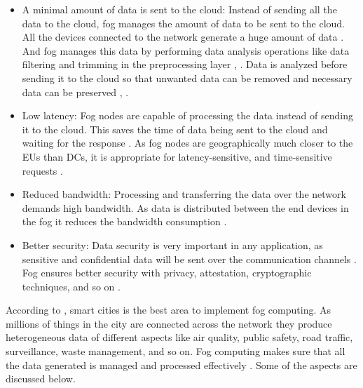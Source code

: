 \begin{itemize}
    \item A minimal amount of data is sent to the cloud:  Instead of sending all the data to the cloud, fog manages the amount of data to be sent to the cloud. All the devices connected to the network generate a huge amount of data \cite{sandra}. And fog manages this data by performing data analysis operations \cite{webpage} like data filtering and trimming in the preprocessing layer \cite{mukherjee2018survey}, \cite{sandra}. Data is analyzed before sending it to the cloud so that unwanted data can be removed  and necessary data can be preserved \cite{webpage}, \cite{sandra}.
    \item Low latency: Fog nodes are capable of processing the data instead of sending it to the cloud. This saves the time of data being sent to the cloud and waiting for the response \cite{sandra}. As fog nodes are geographically much closer to the EUs than DCs, it is appropriate for latency-sensitive, and time-sensitive requests \cite{mukherjee2018survey}.
    \item Reduced bandwidth: Processing and transferring the data over the network demands high bandwidth. As data is distributed between the end devices in the fog it reduces the bandwidth consumption \cite{sandra}. 
    \item Better security: Data security is very important in any application, as sensitive and confidential data will be sent over the communication channels \cite{sandra}. Fog ensures better security with privacy, attestation, cryptographic techniques, and so on \cite{youtube}.
\end{itemize}

According to \cite{sandra}, smart cities is the best area to implement fog computing. As millions of things in the city are connected across the network they produce heterogeneous data of different aspects like air quality, public safety, road traffic, surveillance, waste management, and so on. Fog computing makes sure that all the data generated is managed and processed effectively \cite{sandra}. Some of the aspects are discussed below.

